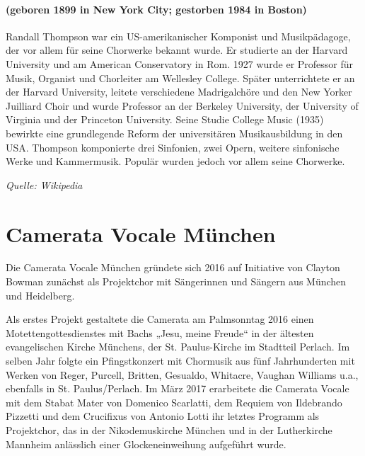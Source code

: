 \documentclass[11pt, ngermanm, titlepage]{article}
\begin{document}
\begin{multicols}{2}
	\paragraph{(geboren 1899 in New York City; gestorben 1984 in Boston) \newline}
	Randall Thompson war ein US-amerikanischer Komponist und Musikpädagoge, der vor allem für seine Chorwerke bekannt wurde. Er studierte an der Harvard University und am American Conservatory in Rom. 1927 wurde er Professor für Musik, Organist und Chorleiter am Wellesley College. Später unterrichtete er an der Harvard University, leitete verschiedene Madrigalchöre und den New Yorker Juilliard Choir und wurde Professor an der Berkeley University, der University of Virginia und der Princeton University. Seine Studie College Music (1935) bewirkte eine grundlegende Reform der universitären Musikausbildung in den USA. Thompson komponierte drei Sinfonien, zwei Opern, weitere sinfonische Werke und Kammermusik. Populär wurden jedoch vor allem seine Chorwerke.
	
	\textit{Quelle: Wikipedia}
	\vfill
	\pagebreak
	
	\section*{Camerata Vocale München}
	Die Camerata Vocale München gründete sich 2016 auf Initiative von Clayton Bowman zunächst als Projektchor mit Sängerinnen und Sängern aus München und Heidelberg.
	
	Als erstes Projekt gestaltete die Camerata am Palmsonntag 2016 einen Motettengottesdienstes mit Bachs „Jesu, meine Freude“  in der ältesten evangelischen Kirche Münchens, der St. Paulus-Kirche im Stadtteil Perlach. Im selben Jahr folgte ein Pfingstkonzert mit Chormusik aus fünf Jahrhunderten mit Werken von Reger, Purcell, Britten, Gesualdo, Whitacre, Vaughan Williams u.a., ebenfalls in St. Paulus/Perlach. Im März 2017 erarbeitete die Camerata Vocale mit dem Stabat Mater von Domenico Scarlatti, dem Requiem von Ildebrando Pizzetti und dem Crucifixus von Antonio Lotti ihr letztes Programm als Projektchor, das in der Nikodemuskirche München und in der Lutherkirche Mannheim anlässlich einer Glockeneinweihung aufgeführt wurde.
	

\end{multicols}
\end{document}
